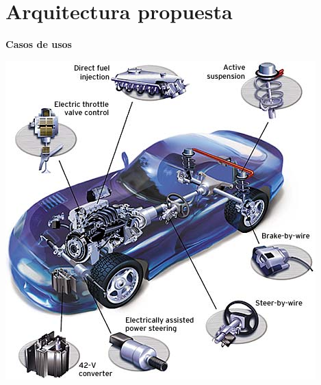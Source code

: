 \section{Arquitectura propuesta}
\begin{frame}[c]
		\centering
		\LARGE \textbf{Casos de usos}
\end{frame}

\begin{frame}[c]
	\centering
	\includegraphics[scale=0.4]{images/ProtocoloCANAuto.png}
\end{frame}